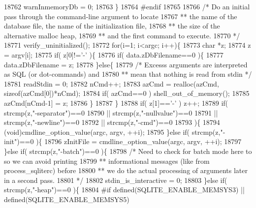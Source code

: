 \begin{DoxyCode}
{{18762     warnInmemoryDb = 0;
18763   \}
18764 \textcolor{preprocessor}{#endif}
18765 
18766   \textcolor{comment}{/* Do an initial pass through the command-line argument to locate}
18767 \textcolor{comment}{  ** the name of the database file, the name of the initialization file,}
18768 \textcolor{comment}{  ** the size of the alternative malloc heap,}
18769 \textcolor{comment}{  ** and the first command to execute.}
18770 \textcolor{comment}{  */}
18771   verify_uninitialized();
18772   \textcolor{keywordflow}{for}(i=1; i<argc; i++)\{
18773     \textcolor{keywordtype}{char} *z;
18774     z = argv[i];
18775     \textcolor{keywordflow}{if}( z[0]!=\textcolor{charliteral}{'-'} )\{
18776       \textcolor{keywordflow}{if}( data.zDbFilename==0 )\{
18777         data.zDbFilename = z;
18778       \}\textcolor{keywordflow}{else}\{
18779         \textcolor{comment}{/* Excesss arguments are interpreted as SQL (or dot-commands) and}
18780 \textcolor{comment}{        ** mean that nothing is read from stdin */}
18781         readStdin = 0;
18782         nCmd++;
18783         azCmd = realloc(azCmd, \textcolor{keyword}{sizeof}(azCmd[0])*nCmd);
18784         \textcolor{keywordflow}{if}( azCmd==0 ) shell_out_of_memory();
18785         azCmd[nCmd-1] = z;
18786       \}
18787     \}
18788     \textcolor{keywordflow}{if}( z[1]==\textcolor{charliteral}{'-'} ) z++;
18789     \textcolor{keywordflow}{if}( strcmp(z,\textcolor{stringliteral}{"-separator"})==0
18790      || strcmp(z,\textcolor{stringliteral}{"-nullvalue"})==0
18791      || strcmp(z,\textcolor{stringliteral}{"-newline"})==0
18792      || strcmp(z,\textcolor{stringliteral}{"-cmd"})==0
18793     )\{
18794       (void)cmdline_option_value(argc, argv, ++i);
18795     \}\textcolor{keywordflow}{else} \textcolor{keywordflow}{if}( strcmp(z,\textcolor{stringliteral}{"-init"})==0 )\{
18796       zInitFile = cmdline_option_value(argc, argv, ++i);
18797     \}\textcolor{keywordflow}{else} \textcolor{keywordflow}{if}( strcmp(z,\textcolor{stringliteral}{"-batch"})==0 )\{
18798       \textcolor{comment}{/* Need to check for batch mode here to so we can avoid printing}
18799 \textcolor{comment}{      ** informational messages (like from process\_sqliterc) before}
18800 \textcolor{comment}{      ** we do the actual processing of arguments later in a second pass.}
18801 \textcolor{comment}{      */}
18802       stdin_is_interactive = 0;
18803     \}\textcolor{keywordflow}{else} \textcolor{keywordflow}{if}( strcmp(z,\textcolor{stringliteral}{"-heap"})==0 )\{
18804 \textcolor{preprocessor}{#if defined(SQLITE\_ENABLE\_MEMSYS3) || defined(SQLITE\_ENABLE\_MEMSYS5)}
}}
\end{DoxyCode}
